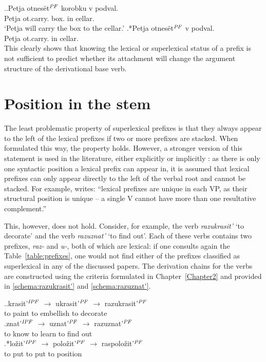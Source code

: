 \ex.\label{ex:otnesti}\ag.Petja otnes\"{e}t$^{\mathit{PF}}$ korobku v podval.\\
Petja ot.carry. box. in cellar.\\
\vspace{0.5em}
`Petja will carry the box to the cellar.'
\bg.*Petja otnes\"{e}t$^{\mathit{PF}}$ v podval.\\
Petja ot.carry. in cellar.\\

This clearly shows that knowing the lexical or superlexical status of a prefix is not sufficient to predict whether its attachment will change the argument structure of the derivational base verb.
\section{Position in the stem}\label{section:new:position}
The least problematic property of superlexical prefixes is that they always appear to the left of the lexical prefixes if two or more prefixes are stacked. When formulated this way, the property holds. However, a stronger version of this statement is used in the literature, either explicitly \citep{Svenonius:04b} or implicitly \citep{Tatevosov:09}: as there is only one syntactic position a lexical prefix can appear in, it is assumed that lexical prefixes can only appear directly to the left of the verbal root and cannot be stacked. For example, \citet[206]{Svenonius:04b} writes: ``lexical prefixes are unique in each VP, as their structural position is unique -- a single V cannot have more than one resultative complement.''


This, however, does not hold. Consider, for example, the verb \textit{razukrasit'} `to decorate' and the verb \textit{razuznat'} `to find out'. Each of these verbs contains two prefixes, \textit{raz-} and \textit{u-}, both of which are lexical: if one consults again the Table~\ref{table:prefixes}, one would not find either of the prefixes classified as superlexical in any of the discussed papers. The derivation chains for the verbs are constructed using the criteria formulated in Chapter~\ref{Chapter2} and provided in \ref{schema:razukrasit'} and \ref{schema:razuznat'}.

\ex.\ag.\label{schema:razukrasit'}krasit'$^{\mathit{IPF}}$ {$\rightarrow$} ukrasit'$^{\mathit{PF}}$ {$\rightarrow$} razukrasit'$^{\mathit{PF}}$\\
{to paint} {} {to embellish} {} {to decorate}\\
\bg.\label{schema:razuznat'}znat'$^{\mathit{IPF}}$ {$\rightarrow$} uznat'$^{\mathit{PF}}$ {$\rightarrow$} razuznat'$^{\mathit{PF}}$\\
{to know} {} {to learn} {} {to find out}\\
\bg.*lo\v{z}it'$^{\mathit{IPF}}$ {$\rightarrow$} polo\v{z}it'$^{\mathit{PF}}$ {$\rightarrow$} raspolo\v{z}it'$^{\mathit{PF}}$\label{schema:raspolozit'}\\
{to put} {} {to put} {} {to position}\\

